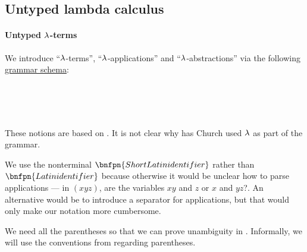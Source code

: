 \subsection{Untyped lambda calculus}\label{subsec:untyped_lambda_calculus}

\paragraph{Untyped \( \synlambda \)-terms}

\begin{definition}\label{def:untyped_lambda_term}\mimprovised
  We introduce \enquote{\( \synlambda \)-terms}, \enquote{\( \synlambda \)-applications} and \enquote{\( \synlambda \)-abstractions} via the following \hyperref[def:formal_grammar/schema]{grammar schema}:
  \begin{bnf*}
        {} \\
     {\bnftsq{\( ( \)} \bnfsp {} \bnfsp {} \bnfsp \bnftsq{\( ) \)}} \\
     {\bnftsq{\( ( \)} \bnfsp \bnftsq{\( \synlambda \)} \bnfsp {} \bnfsp {} \bnfsp {} \bnfsp \bnftsq{\( ) \)}} \\
            { \bnfor {} \bnfor {}}
  \end{bnf*}
\end{definition}
\begin{comments}
  \item These notions are based on \cite[352]{Church1932}. It is not clear why has Church used \( \synlambda \) as part of the grammar.

  \item We use the nonterminal \( \bnfpn{Short Latin identifier} \) rather than \( \bnfpn{Latin identifier} \) because otherwise it would be unclear how to parse applications --- in \( (xyz) \), are the variables \( xy \) and \( z \) or \( x \) and \( yz \)?. An alternative would be to introduce a separator for applications, but that would only make our notation more cumbersome.

  \item We need all the parentheses so that we can prove unambiguity in . Informally, we will use the conventions from  regarding parentheses.
\end{comments}

